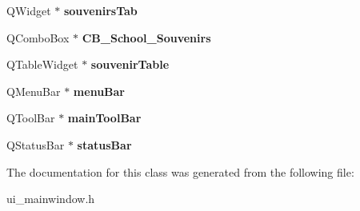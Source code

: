 \begin{DoxyCompactItemize}
Q\+Widget $\ast$ {\bfseries souvenirs\+Tab}
\item 
\mbox{\label{class_ui___main_window_a424c42420628072eea73d3472abd4836}} 
Q\+Combo\+Box $\ast$ {\bfseries C\+B\+\_\+\+School\+\_\+\+Souvenirs}
\item 
\mbox{\label{class_ui___main_window_a5ba338b74df905a52cff88d140783226}} 
Q\+Table\+Widget $\ast$ {\bfseries souvenir\+Table}
\item 
\mbox{\label{class_ui___main_window_a2be1c24ec9adfca18e1dcc951931457f}} 
Q\+Menu\+Bar $\ast$ {\bfseries menu\+Bar}
\item 
\mbox{\label{class_ui___main_window_a5172877001c8c7b4e0f6de50421867d1}} 
Q\+Tool\+Bar $\ast$ {\bfseries main\+Tool\+Bar}
\item 
\mbox{\label{class_ui___main_window_a50fa481337604bcc8bf68de18ab16ecd}} 
Q\+Status\+Bar $\ast$ {\bfseries status\+Bar}
\end{DoxyCompactItemize}


The documentation for this class was generated from the following file\+:\begin{DoxyCompactItemize}
\item 
ui\+\_\+mainwindow.\+h\end{DoxyCompactItemize}
